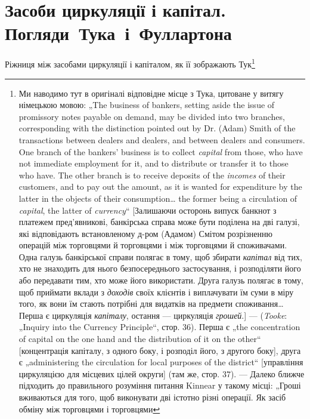 
\section{Засоби циркуляції і капітал.
Погляди~Тука~і~Фуллартона}

Ріжниця між засобами циркуляції і капіталом, як її зображають Тук\footnote{Ми наводимо тут в оригіналі відповідне місце з Тука, цитоване у витягу німецькою мовою:
„The business of bankers, setting aside the
issue of promissory notes payable on demand, may be divided into two branches,
corresponding with the distinction pointed out by Dr. (Adam) Smith of the transactions between
dealers and dealers, and between dealers and consumers. One branch
of the bankers’ business is to collect \emph{capital} from those, who have not immediate
employment for it, and to distribute or transfer it to those who have. The other
branch is to receive deposits of the \emph{incomes} of their customers, and to pay out
the amount, as it is wanted for expenditure by the latter in the objects of their
consumption\dots{} the former being a circulation of \emph{capital}, the latter of \emph{currency}“ [Залишаючи
осторонь випуск банкнот з платежем пред’явникові, банкірська справа
може бути поділена на дві галузі, які відповідають встановленому д-ром (Адамом)
Смітом розрізненню операцій між торговцями й торговцями і між торговцями й
споживачами. Одна галузь банкірської справи полягає в тому, щоб збирати
\emph{капітал} від тих, хто не знаходить для нього безпосереднього застосування,
і розподіляти його або передавати тим, хто може його використати. Друга галузь
полягає в тому, щоб приймати вклади з \emph{доходів} своїх клієнтів і виплачувати їм
суми в міру того, як вони їм стають потрібні для видатків на предмети споживання\dots{} Перша є
циркуляція \emph{капіталу}, остання — циркуляція \emph{грошей}.] —
(\emph{Tooke}: „Inquiry into the Currency Principle“, стор. 36). Перша є „the concentration of capital on
the one hand and the distribution of it on the other“ [концентрація
капіталу, з одного боку, і розподіл його, з другого боку], друга є „administering
the circulation for local purposes of the district“ [управління циркуляцією для
місцевих цілей округи] (там же, стор. 37). — Далеко ближче підходить до
правильного розуміння питання Kinnear у такому місці: „Гроші вживаються
для того, щоб виконувати дві істотно різні операції. Як засіб обміну між торговцями і торговцями
}
